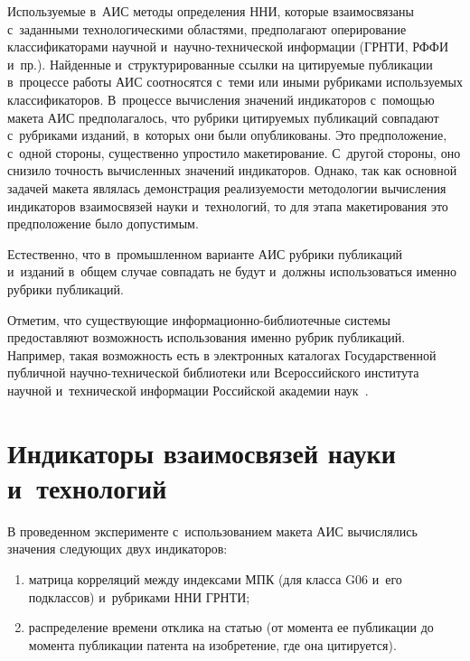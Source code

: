 \begin{multicols}{2}
{}



  Используемые в~АИС методы определения ННИ, которые
взаимосвязаны с~заданными технологическими областями, предполагают опе\-ри\-рование
классификаторами научной и~на\-уч\-но-тех\-ни\-че\-ской информации
(ГРНТИ, РФФИ и~пр.).\linebreak
Найденные и~структурированные ссылки на цитируемые публикации в~процессе работы
АИС соотносятся с~теми или иными рубриками использу\-емых классификаторов. В~процессе
вычисления значений индикаторов с~помощью макета АИС предполагалось, что руб\-ри\-ки
цитиру\-емых публикаций совпадают с~рубриками изданий, в~которых они были
опубликованы. Это предположение, с~одной стороны, существенно упростило
макетирование. С~другой стороны, оно снизило точность вы\-чис\-лен\-ных значений
индикаторов. Однако, так как основной задачей макета являлась демонстрация реализуемости
методологии вычисления индикаторов взаимосвязей науки и~технологий, то для этапа
макетирования это предположение было допустимым.

  Естественно, что в~промышленном варианте АИС рубрики публикаций и~изданий в~общем
{слу\-чае} совпадать не будут и~должны использоваться именно рубрики публикаций.

Отметим,
что существующие ин\-фор\-ма\-ци\-он\-но-биб\-лио\-теч\-ные сис\-те\-мы предоставляют
возможность использования именно рубрик публикаций. Например, такая возможность есть
в электронных каталогах Государственной публичной на\-уч\-но-тех\-ни\-че\-ской
биб\-лиотеки или
Всероссийского института научной и~технической информации Российской академии наук~\cite{19-zat, 20-zat}.


\section{Индикаторы взаимосвязей науки и~технологий}

\vspace*{-2pt}

  В проведенном эксперименте с~использованием макета АИС вычислялись значения
следующих двух индикаторов:\\[-14pt]
  \begin{enumerate}[(1)]
\item матрица корреляций между индексами МПК (для класса G06 и~его подклассов)
и~рубриками ННИ ГРНТИ;
\item распределение времени отклика на статью (от момента ее публикации до момента
публикации патента на изобретение, где она цитируется).
\end{enumerate}





\end{multicols}
